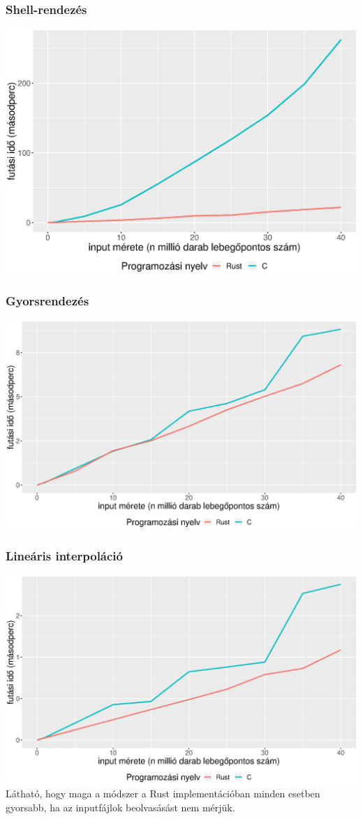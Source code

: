 \subsubsection{Shell-rendezés}
\includegraphics[width=15.5cm]{kepek/shells_sort_run_without_read.eps}
\subsubsection{Gyorsrendezés}
\includegraphics[width=15.5cm]{kepek/quicksort_run_without_read.eps}
\subsubsection{Lineáris interpoláció}
\includegraphics[width=15.5cm]{kepek/linear_interpolation_run_without_read.eps}
Látható, hogy maga a módszer a Rust implementációban minden esetben gyorsabb, ha az inputfájlok beolvasásást nem mérjük.

